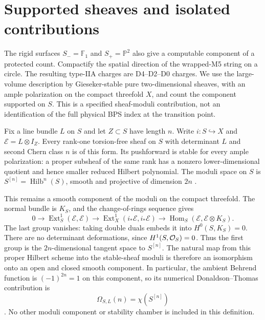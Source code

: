 \section{Supported sheaves and isolated contributions}
\label{subsec:x9-rank-one-index}

The rigid surfaces $S_-=\mathbb F_1$ and $S_+=\mathbb P^2$ also give
a computable component of a protected count. Compactify the spatial
direction of the wrapped-M5 string on a circle. The resulting type-IIA
charges are D4--D2--D0 charges. We use the large-volume description by
Gieseker-stable pure two-dimensional sheaves, with an ample polarization
on the compact threefold $X$, and count the component supported on $S$.
This is a specified sheaf-moduli contribution, not an identification of
the full physical BPS index at the transition point.

Fix a line bundle $L$ on $S$ and let $Z\subset S$ have length $n$.
Write $i:S\hookrightarrow X$ and $\mathcal E=L\otimes I_Z$.
Every rank-one torsion-free sheaf on $S$ with determinant $L$ and second
Chern class $n$ is of this form. Its pushforward is stable for every
ample polarization: a proper subsheaf of the same rank has a nonzero
lower-dimensional quotient and hence smaller reduced Hilbert polynomial.
The moduli space on $S$ is $S^{[n]}=\operatorname{Hilb}^n(S)$,
smooth and projective of dimension $2n$ \cite{Gottsche:2003Hilbert}.

This remains a smooth component of the moduli on the compact threefold.
The normal bundle is $K_S$, and the change-of-rings sequence gives
\begin{equation}
 0\longrightarrow\operatorname{Ext}^1_S(\mathcal E,\mathcal E)
 \longrightarrow\operatorname{Ext}^1_X(i_*\mathcal E,i_*\mathcal E)
 \longrightarrow\operatorname{Hom}_S(\mathcal E,\mathcal E\otimes K_S).
 \label{eq:x9-supported-deformations}
\end{equation}
The last group vanishes: taking double duals embeds it into
$H^0(S,K_S)=0$. There are no determinant deformations, since
$H^1(S,\mathcal O_S)=0$. Thus the first group is the $2n$-dimensional
tangent space to $S^{[n]}$. The natural map from
this proper Hilbert scheme into the stable-sheaf moduli is therefore an
isomorphism onto an open and closed smooth component. In particular,
the ambient Behrend function is $(-1)^{2n}=1$ on this component, so its
numerical Donaldson--Thomas contribution is
\begin{equation}
 \Omega_{S,L}(n)=\chi(S^{[n]})
 \label{eq:x9-supported-dt}
\end{equation}
\cite[Theorem~4.18 and Section~1.2]{Behrend:2009DT}. No other moduli
component or stability chamber is included in this definition.

